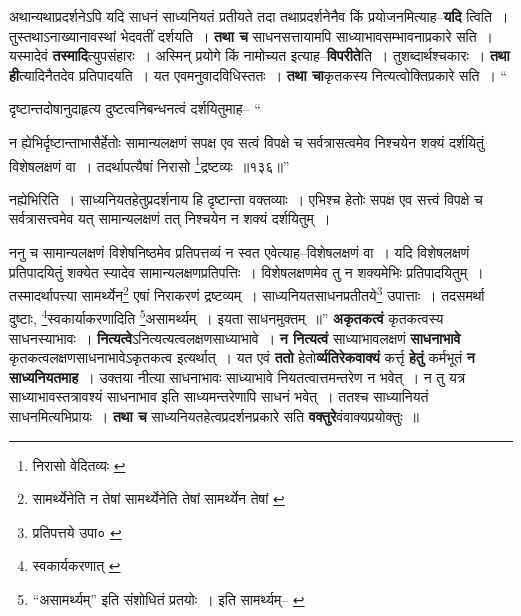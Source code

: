\documentclass[article,12pt,a4paper]{memoir}
\begin{document}
	  \pstart अथान्यथाप्रदर्शनेऽपि यदि साधनं साध्यनियतं प्रतीयते तदा तथाप्रदर्शनेनैव किं प्रयोजनमित्याह--\textbf{यदि} त्विति । तुस्तथाऽनाख्यानावस्थां भेदवतीं दर्शयति । \textbf{तथा च} साधनसत्तायामपि साध्याभावसम्भावनाप्रकारे सति । यस्मादेवं \textbf{तस्मादि}त्युपसंहारः । अस्मिन् प्रयोगे किं नामोच्यत इत्याह--\textbf{विपरीते}ति । तुशब्दार्थश्चकारः । \textbf{तथा ही}त्यादिनैतदेव प्रतिपादयति । यत एवमनुवादविधिस्ततः । \textbf{तथा चा}कृतकस्य नित्यत्वोक्तिप्रकारे सति ।   \leavevmode{} “
	  
	दृष्टान्तदोषानुदाहृत्य दुष्टत्वनिबन्धनत्वं दर्शयितुमाह-- “
	  
	न ह्येभिर्दृष्टान्ताभासैर्हेतोः सामान्यलक्षणं सपक्ष एव सत्वं विपक्षे च सर्वत्रासत्वमेव निश्चयेन शक्यं दर्शयितुं विशेषलक्षणं वा । तदर्थापत्यैषां निरासो \footnote{निरासो वेदितव्यः \cite{dp-msB} \cite{dp-msD} \cite{dp-edP} \cite{dp-edH} \cite{dp-edE} \cite{dp-edN}}द्रष्टव्यः ॥१३६॥” 
	  
	नह्येभिरिति । साध्यनियतहेतुप्रदर्शनाय हि दृष्टान्ता वक्तव्याः । एभिश्च हेतोः सपक्ष एव सत्त्वं विपक्षे च सर्वत्रासत्त्वमेव यत् सामान्यलक्षणं तत् निश्चयेन न शक्यं दर्शयितुम् । 
	  
	ननु च सामान्यलक्षणं विशेषनिष्ठमेव प्रतिपत्तव्यं न स्वत एवेत्याह--विशेषलक्षणं वा । यदि विशेषलक्षणं प्रतिपादयितुं शक्येत स्यादेव सामान्यलक्षणप्रतिपत्तिः । विशेषलक्षणमेव तु न शक्यमेभिः प्रतिपादयितुम् । तस्मादर्थापत्त्या सामर्थ्येन\footnote{सामर्थ्येनेति न तेषां \cite{dp-msA} \cite{dp-msB} \cite{dp-edP} सामर्थ्येनेति तेषां \cite{dp-edE} \cite{dp-edH} सामर्थ्येन तेषां \cite{dp-msD}} एषां निराकरणं द्रष्टव्यम् । साध्यनियतसाधनप्रतीतये\footnote{प्रतिपत्तये उपा० \cite{dp-msB}} उपात्ताः । तदसमर्था दुष्टाः, \footnote{स्वकार्यकरणात् \cite{dp-msA} \cite{dp-msB} \cite{dp-edP} \cite{dp-edH}}स्वकार्याकरणादिति \footnote{“असामर्थ्यम्” इति संशोधितं \cite{dp-msC} \cite{dp-msD} प्रतयोः । इति सामर्थ्यम्--\cite{dp-msA} \cite{dp-msB} \cite{dp-edP} \cite{dp-edH} \cite{dp-edE} \cite{dp-edN}}असामर्थ्यम् । इयता साधनमुक्तम् ॥” \textbf{अकृतकत्वं} कृतकत्वस्य साधनस्याभावः । \textbf{नित्यत्वे}ऽनित्यत्यत्वलक्षणसाध्याभावे । \textbf{न नित्यत्वं} साध्याभावलक्षणं \textbf{साधनाभावे} कृतकत्वलक्षणसाधनाभावेऽकृतकत्व इत्यर्थात् । यत एवं \textbf{ततो} हेतो\textbf{र्व्यतिरेकवाक्यं} कर्त्तृ \textbf{हेतुं} कर्मभूतं \textbf{न साध्यनियतमाह} । उक्तया नीत्या साधनाभावः साध्याभावे नियतत्वात्तमन्तरेण न भवेत् । न तु यत्र साध्याभावस्तत्रावश्यं साधनाभाव इति साध्यमन्तरेणापि साधनं भवेत् । ततश्च साध्यानियतं साधनमित्यभिप्रायः । \textbf{तथा च} साध्यनियतहेत्वप्रदर्शनप्रकारे सति \textbf{वक्तुरे}वंवाक्यप्रयोक्तुः ॥
	\pend
      
\end{document}
